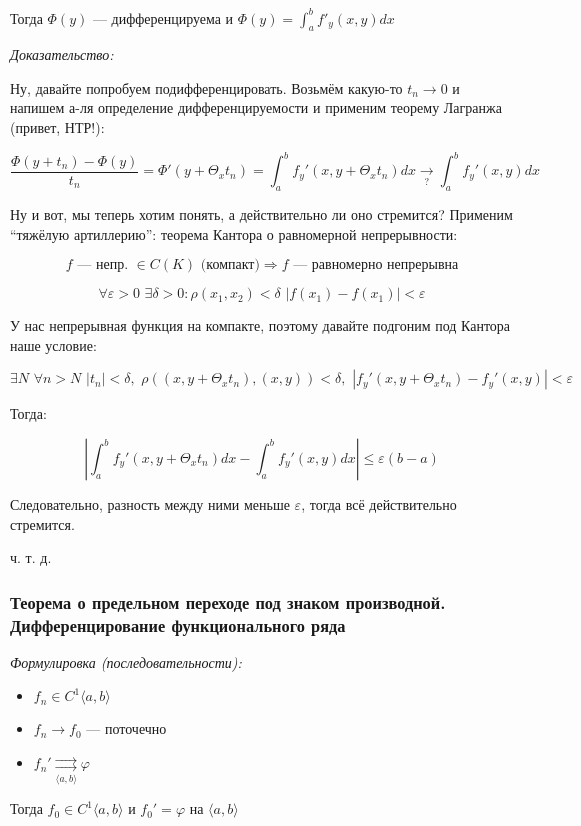 \documentclass{article}
\def\dbl{\,\,}
\def\rsh#1{\underset{#1}{\rightrightarrows}}
\begin{document}
Тогда $\Phi(y)$ --- дифференцируема и $\Phi(y) = \int_a^b f'_y(x, y) dx$

\textit{Доказательство:}

Ну, давайте попробуем подифференцировать. Возьмём какую-то $t_n \rightarrow 0$ и напишем а-ля определение дифференцируемости и применим теорему Лагранжа (привет, НТР!):

\[\frac{\Phi(y + t_n) - \Phi(y)}{t_n} = \Phi'(y + \Theta_x t_n) = \int_a^b f_y'(x, y + \Theta_x t_n) dx \underset{?}{\longrightarrow} \int_a^b f_y'(x, y) dx\]

Ну и вот, мы теперь хотим понять, а действительно ли оно стремится? Применим ``тяжёлую артиллерию'': теорема Кантора о равномерной непрерывности:

\[f \text{ --- непр. } \in C(K) \text{ (компакт)} \Rightarrow f\text{ --- равномерно непрерывна}\]

\[\forall \varepsilon > 0 \dbl \exists \delta > 0: \rho(x_1, x_2) < \delta \dbl |f(x_1) - f(x_1)| < \varepsilon\]

У нас непрерывная функция на компакте, поэтому давайте подгоним под Кантора наше условие:

\[\exists N \dbl \forall n > N \dbl |t_n| < \delta, \dbl \rho((x, y + \Theta_x t_n), (x, y)) < \delta, \dbl
\left|f_y'(x, y + \Theta_x t_n) - {f_y'(x, y)}\right| < \varepsilon\]

Тогда: 

\[\left|\int_a^b{f_y'(x, y + \Theta_x t_n) dx} - \int_a^b{f_y'(x, y) dx}\right| \le \varepsilon (b - a)\]

Следовательно, разность между ними меньше $\varepsilon$, тогда всё действительно стремится.

ч. т. д.

\subsubsection{Теорема о предельном переходе под знаком производной. Дифференцирование функционального ряда}
\textit{Формулировка (последовательности):}

\begin{itemize}
    \item $f_n \in C^1\langle a, b \rangle$
    \item $f_n \rightarrow f_0$ --- поточечно
    \item $f_n' \rsh{\langle a, b \rangle} \varphi$
\end{itemize}

Тогда $f_0 \in C^1\langle a, b \rangle$ и $f_0' = \varphi$ на $\langle a, b \rangle$
\end{document}
